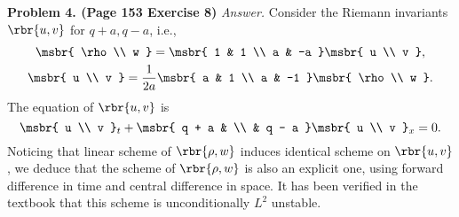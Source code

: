 \documentclass[english, nochinese]{pnote}
\begin{document}
\textbf{Problem 4. (Page 153 Exercise 8)} \textit{Answer.} Consider the Riemann invariants $ \rbr{ u, v } $ for $ q + a, q - a $, i.e.,
\begin{gather}
\msbr{ \rho \\ w } = \msbr{ 1 & 1 \\ a & -a } \msbr{ u \\ v }, \\
\msbr{ u \\ v } = \frac{1}{ 2 a } \msbr{ a & 1 \\ a & -1 } \msbr{ \rho \\ w }.
\end{gather}
The equation of $ \rbr{ u, v } $ is
\begin{equation}
\msbr{ u \\ v }_t + \msbr{ q + a & \\ & q - a } \msbr{ u \\ v }_x = 0.
\end{equation}
Noticing that linear scheme of $ \rbr{ \rho, w } $ induces identical scheme on $ \rbr{ u, v } $, we deduce that the scheme of $ \rbr{ \rho, w } $ is also an explicit one, using forward difference in time and central difference in space. It has been verified in the textbook that this scheme is unconditionally $L^2$ unstable.
\end{document}
